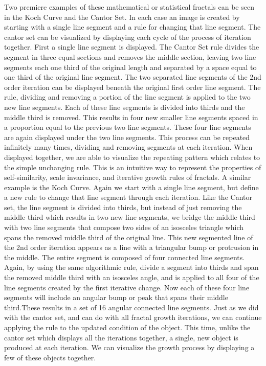 \documentclass[english,jou]{apa6}
\begin{document}
Two premiere examples of these mathematical or statistical fractals can be seen in the Koch Curve and the Cantor Set. In each case an image is created by starting with a single line segment and a rule for changing that line segment. The cantor set can be visualized by displaying each cycle of the process of iteration together. First a single line segment is displayed. The Cantor Set rule divides the segment in three equal sections and removes the middle section, leaving two line segments each one third of the original length and separated by a space equal to one third of the original line segment. The two separated line segments of the 2nd order iteration can be displayed beneath the original first order line segment. The rule, dividing and removing a portion of the line segment is applied to the two new line segments. Each of these line segments is divided into thirds and the middle third is removed. This results in four new smaller line segments spaced in a proportion equal to the previous two line segments. These four line segments are again displayed under the two line segments. This process can be repeated infinitely many times, dividing and removing segments at each iteration. When displayed together, we are able to visualize the repeating pattern which relates to the simple unchanging rule. This is an intuitive way to represent the properties of self-similarity, scale invariance, and iterative growth rules of fractals. A similar example is the Koch Curve. Again we start with a single line segment, but define a new rule to change that line segment through each iteration. Like the Cantor set, the line segment is divided into thirds, but instead of just removing the middle third which results in two new line segments, we bridge the middle third with two line segments that compose two sides of an isosceles triangle which spans the removed middle third of the original line. This new segmented line of the 2nd order iteration appears as a line with a triangular bump or protrusion in the middle. The entire segment is composed of four connected line segments. Again, by using the same algorithmic rule, divide a segment into thirds and span the removed middle third with an isosceles angle, and is applied to all four of the line segments created by the first iterative change. Now each of these four line segments will include an angular bump or peak that spans their middle third.These results in a set of 16 angular connected line segments. Just as we did with the cantor set, and can do with all fractal growth iterations, we can continue applying the rule to the updated condition of the object. This time, unlike the cantor set which displays all the iterations together, a single, new object is produced at each iteration. We can visualize the growth process by displaying a few of these objects together.
\end{document}

